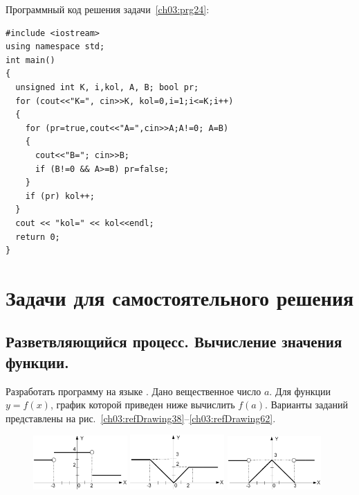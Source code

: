 Программный код решения задачи~\ref{ch03:prg24}:
\begin{lstlisting}
#include <iostream>
using namespace std;
int main()
{
  unsigned int K, i,kol, A, B; bool pr;
  for (cout<<"K=", cin>>K, kol=0,i=1;i<=K;i++)
  {
    for (pr=true,cout<<"A=",cin>>A;A!=0; A=B)
    {
      cout<<"B="; cin>>B;
      if (B!=0 && A>=B) pr=false;
    }
    if (pr) kol++;
  }
  cout << "kol=" << kol<<endl;
  return 0;
}
\end{lstlisting}


\section[Задачи для самостоятельного решения]{Задачи для самостоятельного решения}
\subsection[Разветвляющийся процесс. Вычисление значения функции.]{Разветвляющийся процесс. Вычисление значения
функции.}
Разработать программу на языке . Дано вещественное число $a$. Для функции
$y=f(x)$, график которой приведен ниже вычислить
$f(a)$. Варианты заданий представлены на рис.~\ref{ch03:refDrawing38}--\ref{ch03:refDrawing62}.

\begin{figure}[h]%
\begin{floatrow}[3]
{\includegraphics[width=0.32\textwidth,keepaspectratio]{img/ris_3_39}}
{\includegraphics[width=0.32\textwidth,keepaspectratio]{img/ris_3_40}}
{\includegraphics[width=0.32\textwidth,keepaspectratio]{img/ris_3_41}}
\end{floatrow}
\end{figure}%

